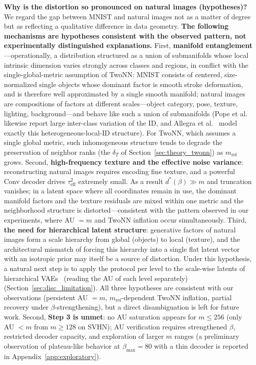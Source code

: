 \documentclass[make,article,submit,pdftex,moreauthors]{Definitions/mdpi}
\newcommand{\dstar}{d^{*}(\beta)}
\begin{document}
\textbf{Why is the distortion so pronounced on natural images
(hypotheses)?}
We regard the gap between MNIST and natural images not as a matter of
degree but as reflecting a qualitative difference in data geometry.
\textbf{The following mechanisms are hypotheses consistent with the
observed pattern, not experimentally distinguished explanations.}
First, \textbf{manifold entanglement}---operationally, a distribution
structured as a union of submanifolds whose local intrinsic dimension
varies strongly across classes and regions, in conflict with the
single-global-metric assumption of TwoNN: MNIST consists of centered,
size-normalized single objects whose dominant factor is smooth stroke
deformation, and is therefore well approximated by a single smooth
manifold; natural images are compositions of factors at different
scales---object category, pose, texture, lighting, background---and behave
like such a union of submanifolds (Pope et
al.~\cite{pope2021intrinsic} likewise report large inter-class variation
of the ID, and Allegra et al.~\cite{allegra2020data} model exactly this
heterogeneous-local-ID structure).
For TwoNN, which assumes a single global metric, such inhomogeneous
structure tends to degrade the preservation of neighbor ranks (the
$\delta_T$ of Section~\ref{sec:theory_twonn}) as $m_{\mathrm{ref}}$
grows.
Second, \textbf{high-frequency texture and the effective noise variance}:
reconstructing natural images requires encoding fine texture, and a
powerful Conv decoder drives $\tau^2_{\mathrm{eff}}$ extremely small.
As a result $\dstar \gg m$ and truncation vanishes; in a latent space where
all coordinates remain in use, the dominant manifold factors and the
texture residuals are mixed within one metric and the neighborhood
structure is distorted---consistent with the pattern observed in our
experiments, where AU $= m$ and TwoNN inflation occur simultaneously.
Third, \textbf{the need for hierarchical latent structure}: generative
factors of natural images form a scale hierarchy from global (objects) to
local (texture), and the architectural mismatch of forcing this hierarchy
into a single flat latent vector with an isotropic prior may itself be a
source of distortion.
Under this hypothesis, a natural next step is to apply the protocol
per level to the scale-wise latents of hierarchical
VAEs~\cite{sonderby2016ladder} (reading the AU of each level separately)
(Section~\ref{sec:disc_limitation}).
All three hypotheses are consistent with our observations (persistent
AU $= m$, $m_{\mathrm{ref}}$-dependent TwoNN inflation, partial recovery
under $\beta$-strengthening), but a direct disambiguation is left for
future work.
Second, \textbf{Step 3 is unmet}: no AU saturation appears for
$m \leq 256$ (only AU $< m$ from $m \geq 128$ on SVHN); AU verification
requires strengthened $\beta$, restricted decoder capacity, and exploration
of larger $m$ ranges (a preliminary observation of plateau-like behavior at
$\beta_{\max} = 80$ with a thin decoder is reported in
Appendix~\ref{app:exploratory}).
\end{document}
